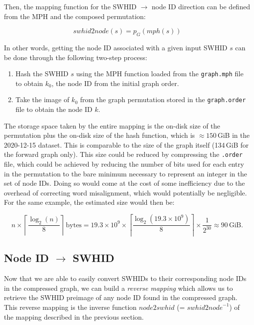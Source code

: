 Then, the mapping function for the \gls{SWHID} $\to$ node ID direction can be
defined from the \gls{MPH} and the composed permutation:

\[\mathit{swhid2node}(s) = p_G(\mathit{mph}(s))\]

In other words, getting the node ID associated with a given input \gls{SWHID}
$s$ can be done through the following two-step process:

\begin{enumerate}
    \item Hash the \gls{SWHID} $s$ using the \gls{MPH} function loaded from the
        \texttt{graph.mph} file to obtain $k_0$, the node ID from the initial
        graph order.
    \item Take the image of $k_0$ from the graph permutation stored in the
        \texttt{graph.order} file to obtain the node ID $k$.
\end{enumerate}

The storage space taken by the entire mapping is the on-disk size of the
permutation plus the on-disk size of the hash function, which is $\approx
150$\,GiB in the 2020-12-15 dataset. This is comparable to the size of the
graph itself (134\,GiB for the forward graph only). This size could be reduced
by compressing the \texttt{.order} file, which could be achieved by reducing
the number of bits used for each entry in the permutation to the bare minimum
necessary to represent an integer in the set of node IDs. Doing so would come
at the cost of some inefficiency due to the overhead of correcting word
misalignment, which would potentially be negligible.  For the same example, the
estimated size would then be:

\[
    n \times \left\lceil{\frac{\log_2(n)}{8}}\right\rceil\,\mathrm{bytes}
    = 19.3 \times 10^9 \times
        \left\lceil{\frac{\log_2(19.3 \times 10^9)}{8}}\right\rceil
        \times \frac{1}{2^{30}}
    \approx 90\,\mathrm{GiB.}
\]

\subsection{Node ID $\to$ SWHID}%
\label{sec:node2swhid}

Now that we are able to easily convert \glspl{SWHID} to their corresponding
node IDs in the compressed graph, we can build a \emph{reverse mapping} which
allows us to retrieve the \gls{SWHID} preimage of any node ID found in the
compressed graph. This reverse mapping is the inverse function
$\mathit{node2swhid}$ (= $\mathit{swhid2node}^{-1}$) of the mapping
described in the previous section.

